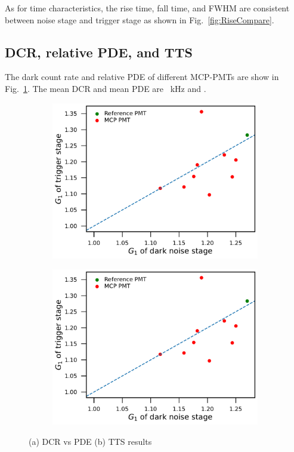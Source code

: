 As for time characteristics, the rise time, fall time, and FWHM are consistent between noise stage and trigger stage as shown in Fig.~\ref{fig:RiseCompare}.

\subsection{DCR, relative PDE, and TTS}
The dark count rate and relative PDE of different MCP-PMTs are show in Fig.~\ref{fig:DCRCompare}. The mean DCR and mean PDE are \SI{}{kHz} and .
\begin{figure}[!htbp]
    \centering
    \begin{subfigure}[b]{0.49\textwidth}
        \includegraphics[width=\textwidth,page=8]{figures/result/compare.pdf}
        \caption{}
        \label{fig:DCRCompare}
    \end{subfigure}
    \begin{subfigure}[b]{0.49\textwidth}
        \includegraphics[width=\textwidth,page=9]{figures/result/compare.pdf}
        \caption{}
        \label{fig:TTSCompare}
    \end{subfigure}
    \caption{(a) DCR vs PDE (b) TTS results}
\end{figure}

